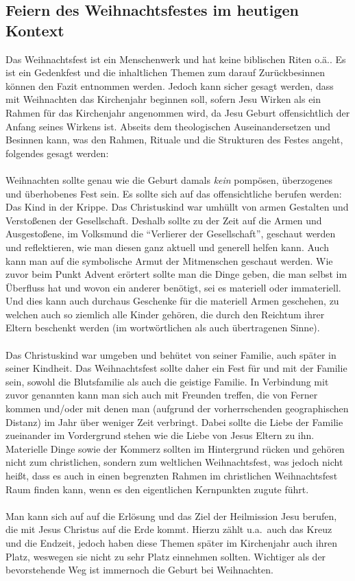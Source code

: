 \subsection{Feiern des Weihnachtsfestes im heutigen Kontext}
Das Weihnachtsfest ist ein Menschenwerk und hat keine biblischen Riten o.ä.. Es ist ein Gedenkfest und die inhaltlichen Themen zum darauf Zurückbesinnen können den Fazit entnommen werden. Jedoch kann sicher gesagt werden, dass mit Weihnachten das Kirchenjahr beginnen soll, sofern Jesu Wirken als ein Rahmen für das Kirchenjahr angenommen wird, da Jesu Geburt offensichtlich der Anfang seines Wirkens ist. Abseits dem theologischen Auseinandersetzen und Besinnen kann, was den Rahmen, Rituale und die Strukturen des Festes angeht, folgendes gesagt werden:
\\~\\
Weihnachten sollte genau wie die Geburt damals \textit{kein} pompösen, überzogenes und überhobenes Fest sein. Es sollte sich auf das offensichtliche berufen werden: Das Kind in der Krippe. Das Christuskind war umhüllt von armen Gestalten und Verstoßenen der Gesellschaft. Deshalb sollte zu der Zeit auf die Armen und Ausgestoßene, im Volksmund die ``Verlierer der Gesellschaft'', geschaut werden und reflektieren, wie man diesen ganz aktuell und generell helfen kann. Auch kann man auf die symbolische Armut der Mitmenschen geschaut werden. Wie zuvor beim Punkt Advent erörtert sollte man die Dinge geben, die man selbst im Überfluss hat und wovon ein anderer benötigt, sei es materiell oder immateriell. Und dies kann auch durchaus Geschenke für die materiell Armen geschehen, zu welchen auch so ziemlich alle Kinder gehören, die durch den Reichtum ihrer Eltern beschenkt werden (im wortwörtlichen als auch übertragenen Sinne).
\\~\\
Das Christuskind war umgeben und behütet von seiner Familie, auch später in seiner Kindheit. Das Weihnachtsfest sollte daher ein Fest für und mit der Familie sein, sowohl die Blutsfamilie als auch die geistige Familie. In Verbindung mit zuvor genannten kann man sich auch mit Freunden treffen, die von Ferner kommen und/oder mit denen man (aufgrund der vorherrschenden geographischen Distanz) im Jahr über weniger Zeit verbringt. Dabei sollte die Liebe der Familie zueinander im Vordergrund stehen wie die Liebe von Jesus Eltern zu ihn. Materielle Dinge sowie der Kommerz sollten im Hintergrund rücken und gehören nicht zum christlichen, sondern zum weltlichen Weihnachtsfest, was jedoch nicht heißt, dass es auch in einen begrenzten Rahmen im christlichen Weihnachtsfest Raum finden kann, wenn es den eigentlichen Kernpunkten zugute führt.  
\\~\\
Man kann sich auf auf die Erlösung und das Ziel der Heilmission Jesu berufen, die mit Jesus Christus auf die Erde kommt. Hierzu zählt u.a.\ auch das Kreuz und die Endzeit, jedoch haben diese Themen später im Kirchenjahr auch ihren Platz, weswegen sie nicht zu sehr Platz einnehmen sollten. Wichtiger als der bevorstehende Weg ist immernoch die Geburt bei Weihnachten.

